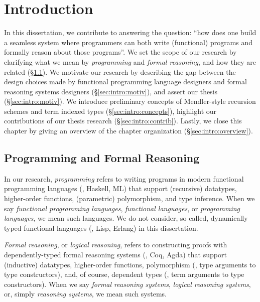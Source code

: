 \chapter{Introduction}\label{ch:intro}

In this dissertation, we contribute to answering the question:
``how does one build a seamless system where programmers can both
write (functional) programs and formally reason about those programs''.
We set the scope of our research by clarifying what we mean by
\emph{programming} and \emph{formal reasoning}, and how they are related
(\S\ref{sec:intro:scope}). We motivate our research by describing the gap
between the design choices made by functional programming language designers and
formal reasoning systems designers (\S\ref{sec:intro:motiv}), and assert
our thesis (\S\ref{sec:intro:motiv}). We introduce preliminary concepts
of Mendler-style recursion schemes and term indexed types
(\S\ref{sec:intro:concepts}), highlight our contributions of
our thesis research (\S\ref{sec:intro:contrib}). Lastly, we close
this chapter by %
giving an overview of the chapter organization (\S\ref{sec:intro:overview}).

\section{Programming and Formal Reasoning}\label{sec:intro:scope}

In our research, \emph{programming} refers to writing programs in
modern functional programming languages (\eg, Haskell, ML) that support
(recursive) datatypes, higher-order functions, (parametric) polymorphism,
and type inference. When we say \emph{functional programming languages},
\emph{functional languages}, or \emph{programming languages},
we mean such languages. We do not consider,
so called, dynamically typed functional languages (\eg, Lisp, Erlang)
in this dissertation.

\emph{Formal reasoning}, or \emph{logical reasoning},
refers to constructing proofs with depend\-ently-typed formal reasoning systems
(\eg, Coq, Agda) that support (inductive) datatypes, higher-order functions,
polymorphism (\ie, type arguments to type constructors), and, of course,
dependent types (\ie, term arguments to type constructors). When we say
\emph{formal reasoning systems}, \emph{logical reasoning systems},
or, simply \emph{reasoning systems}, we mean such systems.

